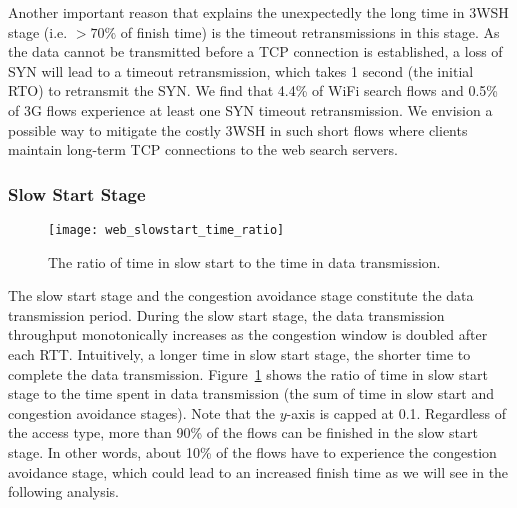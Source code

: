 Another important reason that explains the unexpectedly the long time in 3WSH stage (i.e. $>70\%$ of finish time) is the timeout retransmissions in this stage. As the data cannot be transmitted before a TCP connection is established, a loss of SYN will lead to a timeout retransmission, which takes 1 second (\ie the initial RTO) to retransmit the SYN.  We find that 4.4\% of WiFi search flows and 0.5\% of 3G flows experience at least one SYN timeout retransmission. We envision a possible way to mitigate the costly 3WSH in such short flows where clients maintain long-term TCP connections to the web search servers.


\subsubsection{Slow Start Stage}

\begin{figure}[th]
\centering
\texttt{[image: web\_slowstart\_time\_ratio]}
\caption{The ratio of time in slow start to the time in data transmission.}
\label{fig:web_ss_time_ratio}
\end{figure}

The slow start stage and the congestion avoidance stage constitute the data transmission period. During the slow start stage, the data transmission throughput monotonically increases as the congestion window is doubled after each RTT. Intuitively, a longer time in slow start stage, the shorter time to complete the data transmission. Figure~\ref{fig:web_ss_time_ratio} shows the ratio of time in slow start stage to the time spent in data transmission (\ie the sum of time in slow start and congestion avoidance stages). Note that the $y$-axis is capped at 0.1. Regardless of the access type, more than 90\% of the flows can be finished in the slow start stage. In other words, about 10\% of the flows have to experience the congestion avoidance stage, which could lead to an increased finish time as we will see in the following analysis.

